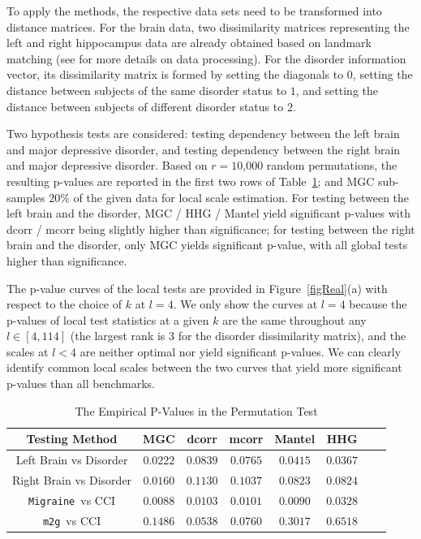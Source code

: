 \documentclass[11pt]{article}
\providecommand{\sct}[1]{{\sc \texttt{#1}}}
\newcommand{\Migraine}{\sct{Migraine}}
\newcommand{\mtg}{\sct{m2g}}
\begin{document}
To apply the methods, the respective data sets need to be transformed into distance matrices. For the brain data, two dissimilarity matrices representing the left and right hippocampus data are already obtained based on landmark matching (see \cite{ParkEtAl2011} for more details on data processing). For the disorder information vector,
its dissimilarity matrix is formed by setting the diagonals to $0$, setting the distance between subjects of the same disorder status to $1$, and setting the distance between subjects of different disorder status to $2$.

Two hypothesis tests are considered: testing dependency between the left brain and major depressive disorder, and testing dependency between the right brain and major depressive disorder. Based on $r=10$,$000$ random permutations, the resulting p-values are reported in the first two rows of Table~\ref{table1}; and MGC sub-samples $20\%$ of the given data for local scale estimation. For testing between the left brain and the disorder, MGC / HHG / Mantel yield significant p-values with dcorr / mcorr being slightly higher than significance; for testing between the right brain and the disorder, only MGC yields significant p-value, with all global tests higher than significance. 

The p-value curves of the local tests are provided in Figure~\ref{figReal}(a) with respect to the choice of $k$ at $l=4$. We only show the curves at $l=4$ because the p-values of local test statistics at a given $k$ are the same throughout any $l \in [4,114]$ (the largest rank is $3$ for the disorder dissimilarity matrix), and the scales at $l<4$ are neither optimal nor yield significant p-values. We can clearly identify common local scales between the two curves that yield more significant p-values than all benchmarks. %


\begin{table}[!t]
\footnotesize
\renewcommand{\arraystretch}{0.5}
\centering
{\begin{tabular}{|c||c|c|c|c|c|c|c|}
\hline
Testing Method & MGC & dcorr & mcorr & Mantel & HHG \\
\hline
Left Brain vs Disorder  & $0.0222$ & $0.0839$ & $0.0765$ & $0.0415$ & $0.0367$ \\
\hline
Right Brain vs Disorder & $0.0160$ & $0.1130$ & $0.1037$  & $0.0823$ & $0.0824$\\
\hline
\Migraine~vs CCI & $0.0088$ & $0.0103$ & $0.0101$  & $0.0090$ & $0.0328$\\
\hline
\mtg~vs CCI & $0.1486$ & $0.0538$ & $0.0760$  & $0.3017$ & $0.6518$\\
\hline
\end{tabular}
\caption{The Empirical P-Values in the Permutation Test}
\label{table1}
}
\end{table}
\end{document}
